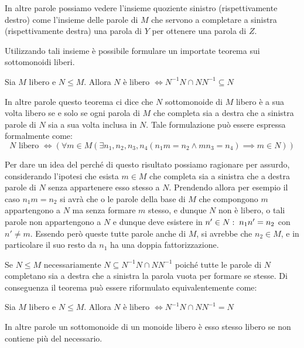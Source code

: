 In altre parole possiamo vedere l'insieme quoziente sinistro (rispettivamente destro) come l'insieme delle parole di \(M\) che servono a completare a sinistra (rispettivamente destra) una parola di \(Y\) per ottenere una parola di \(Z\).

Utilizzando tali insieme è possibile formulare un importate teorema sui sottomonoidi liberi.

\begin{theorem}[Schuïtzenberger]\label{thm:schuïtzenberger}
  Sia \(M\) libero e \(N \leq M\). Allora \(N \text{ è libero } \iff N^{-1}N \cap NN^{-1} \subseteq N\)
\end{theorem}
In altre parole questo teorema ci dice che \(N\) sottomonoide di \(M\) libero è a sua volta libero se e solo se ogni parola di \(M\) che completa sia a destra che a sinistra parole di \(N\) sia a sua volta inclusa in \(N\).
Tale formulazione può essere espressa formalmente come:
\[N \text{ libero } \iff \left(\forall m \in M (\exists n_1,n_2,n_3,n_4( n_1m=n_2 \land mn_3=n_4) \implies m \in N)\right)\]

Per dare un idea del perché di questo risultato possiamo ragionare per assurdo, considerando l'ipotesi che esista \(m \in M\) che completa sia a sinistra che a destra parole di \(N\) senza appartenere esso stesso a \(N\).
Prendendo allora per esempio il caso \(n_1m=n_2\) si avrà che o le parole della base di \(M\) che compongono \(m\) appartengono a \(N\) ma senza formare \(m\) stesso, e dunque \(N\) non è libero, o tali parole non appartengono a \(N\) e dunque deve esistere in \(n' \in N:\; n_1n'=n_2\) con \(n' \neq m\).
Essendo però queste tutte parole anche di \(M\), si avrebbe che \(n_2 \in M\), e in particolare il suo resto da \(n_1\) ha una doppia fattorizzazione.

\begin{note}[Osservazioni]
  Se \(N\leq M\) necessariamente \(N \subseteq N^{-1}N \cap NN^{-1}\) poiché tutte le parole di \(N\) completano sia a destra che a sinistra la parola vuota per formare se stesse.
  Di conseguenza il teorema può essere riformulato equivalentemente come:
  \begin{theorem}
    Sia \(M\) libero e \(N \leq M\). Allora \(N \text{ è libero } \iff N^{-1}N \cap NN^{-1} = N\)
  \end{theorem}
  In altre parole un sottomonoide di un monoide libero è esso stesso libero se non contiene più del necessario.
\end{note}

